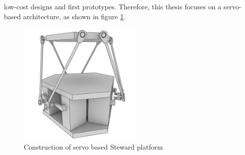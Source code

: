 low-cost designs and first prototypes. Therefore, this thesis focuses on a
servo-based architecture, as shown in figure \ref{fig:stewart}.
\begin{figure}
	\centering
	\includegraphics[width=6cm]{../figures/stewart}
	\caption{Construction of servo based Steward platform}
	\label{fig:stewart}
\end{figure}

